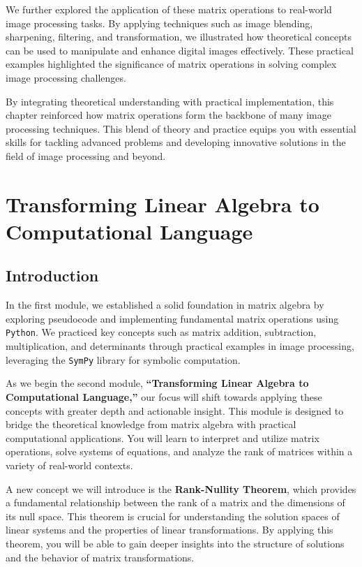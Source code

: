 \documentclass[
  letterpaper,
  DIV=11,
  numbers=noendperiod]{scrreprt}
\theoremstyle{plain}
\theoremstyle{definition}
\theoremstyle{remark}
\begin{document}
We further explored the application of these matrix operations to
real-world image processing tasks. By applying techniques such as image
blending, sharpening, filtering, and transformation, we illustrated how
theoretical concepts can be used to manipulate and enhance digital
images effectively. These practical examples highlighted the
significance of matrix operations in solving complex image processing
challenges.

By integrating theoretical understanding with practical implementation,
this chapter reinforced how matrix operations form the backbone of many
image processing techniques. This blend of theory and practice equips
you with essential skills for tackling advanced problems and developing
innovative solutions in the field of image processing and beyond.


\chapter{Transforming Linear Algebra to Computational
Language}\label{transforming-linear-algebra-to-computational-language}

\section{Introduction}\label{introduction-2}

In the first module, we established a solid foundation in matrix algebra
by exploring pseudocode and implementing fundamental matrix operations
using \texttt{Python}. We practiced key concepts such as matrix
addition, subtraction, multiplication, and determinants through
practical examples in image processing, leveraging the \texttt{SymPy}
library for symbolic computation.

As we begin the second module, \textbf{``Transforming Linear Algebra to
Computational Language,''} our focus will shift towards applying these
concepts with greater depth and actionable insight. This module is
designed to bridge the theoretical knowledge from matrix algebra with
practical computational applications. You will learn to interpret and
utilize matrix operations, solve systems of equations, and analyze the
rank of matrices within a variety of real-world contexts.

A new concept we will introduce is the \textbf{Rank-Nullity Theorem},
which provides a fundamental relationship between the rank of a matrix
and the dimensions of its null space. This theorem is crucial for
understanding the solution spaces of linear systems and the properties
of linear transformations. By applying this theorem, you will be able to
gain deeper insights into the structure of solutions and the behavior of
matrix transformations.
\end{document}
